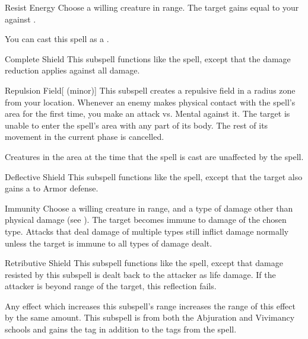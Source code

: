 \begin{ability}[\nth{1}]{Resist Energy}
Choose a willing creature in \rngclose range.
The target gains  equal to your  against .

You can cast this spell as a .
\end{ability}
\vspace{0.25em}


\begin{ability}[\nth{2}]{Complete Shield}
This subspell functions like the  spell, except that the damage reduction applies against all damage.
\end{ability}
\vspace{0.25em}


\begin{ability}[\nth{2}]{Repulsion Field}[ (minor)]
This subspell creates a repulsive field in a \areamed radius zone from your location.
Whenever an enemy makes physical contact with the spell's area for the first time, you make an attack vs. Mental against it.
\hit The target is unable to enter the spell's area with any part of its body.
The rest of its movement in the current phase is cancelled.

Creatures in the area at the time that the spell is cast are unaffected by the spell.
\end{ability}
\vspace{0.25em}


\begin{ability}[\nth{3}]{Deflective Shield}
This subspell functions like the  spell, except that the target also gains a   to Armor defense.
\end{ability}
\vspace{0.25em}


\begin{ability}[\nth{3}]{Immunity}
Choose a willing creature in \rngclose range, and a type of damage other than physical damage (see ).
The target becomes immune to damage of the chosen type.
Attacks that deal damage of multiple types still inflict damage normally unless the target is immune to all types of damage dealt.
\end{ability}
\vspace{0.25em}


\begin{ability}[\nth{3}]{Retributive Shield}
This subspell functions like the  spell, except that damage resisted by this subspell is dealt back to the attacker as life damage.
If the attacker is beyond \rngclose range of the target, this reflection fails.

Any effect which increases this subspell's range increases the range of this effect by the same amount.
This subspell is from both the Abjuration and Vivimancy schools and gains the  tag in addition to the tags from the  spell.
\end{ability}
\vspace{0.25em}


